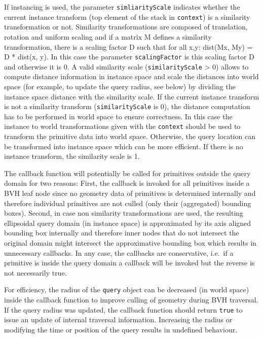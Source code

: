 If instancing is used, the parameter \texttt{simliarityScale} indicates
whether the current instance transform (top element of the stack in
\texttt{context}) is a similarity transformation or not. Similarity
transformations are composed of translation, rotation and uniform
scaling and if a matrix M defines a similarity transformation, there is
a scaling factor D such that for all x,y: dist(Mx, My) = D * dist(x, y).
In this case the parameter \texttt{scalingFactor} is this scaling factor
D and otherwise it is 0. A valid similarity scale
(\texttt{similarityScale} \textgreater{} 0) allows to compute distance
information in instance space and scale the distances into world space
(for example, to update the query radius, see below) by dividing the
instance space distance with the similarity scale. If the current
instance transform is not a similarity transform
(\texttt{similarityScale} is 0), the distance computation has to be
performed in world space to ensure correctness. In this case the
instance to world transformations given with the \texttt{context} should
be used to transform the primitive data into world space. Otherwise, the
query location can be transformed into instance space which can be more
efficient. If there is no instance transform, the similarity scale is 1.

The callback function will potentially be called for primitives outside
the query domain for two reasons: First, the callback is invoked for all
primitives inside a BVH leaf node since no geometry data of primitives
is determined internally and therefore individual primitives are not
culled (only their (aggregated) bounding boxes). Second, in case non
similarity transformations are used, the resulting ellipsoidal query
domain (in instance space) is approximated by its axis aligned bounding
box internally and therefore inner nodes that do not intersect the
original domain might intersect the approximative bounding box which
results in unnecessary callbacks. In any case, the callbacks are
conservative, i.e.~if a primitive is inside the query domain a callback
will be invoked but the reverse is not necessarily true.

For efficiency, the radius of the \texttt{query} object can be decreased
(in world space) inside the callback function to improve culling of
geometry during BVH traversal. If the query radius was updated, the
callback function should return \texttt{true} to issue an update of
internal traversal information. Increasing the radius or modifying the
time or position of the query results in undefined behaviour.

